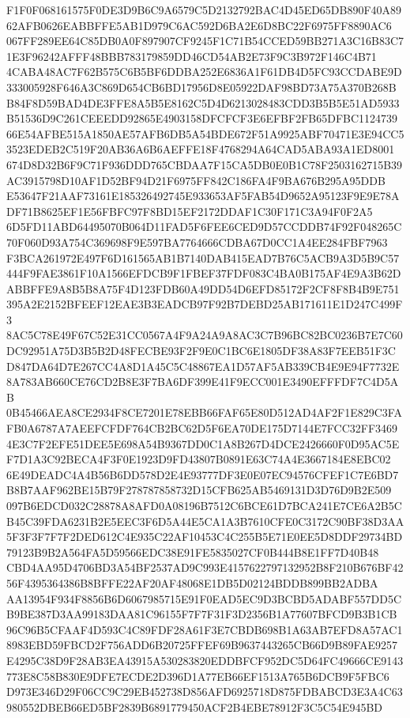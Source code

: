 \documentclass[UTF8,fontset=fandol,zihao=-4,a4paper]{ctexart}
\begin{document}
{{F1F0F068161575F0DE3D9B6C9A6579C5D2132792BAC4D45ED65DB890F40A8962AFB0626EABBFFE5AB1D979C6AC592D6BA2E6D8BC22F6975FF8890AC6
067FF289EE64C85DB0A0F897907CF9245F1C71B54CCED59BB271A3C16B83C71E3F96242AFFF48BBB783179859DD46CD54AB2E73F9C3B972F146C4B71
4CABA48AC7F62B575C6B5BF6DDBA252E6836A1F61DB4D5FC93CCDABE9D333005928F646A3C869D654CB6BD17956D8E05922DAF98BD73A75A370B268B
B84F8D59BAD4DE3FFE8A5B5E8162C5D4D6213028483CDD3B5B5E51AD5933B51536D9C261CEEEDD92865E4903158DFCFCF3E6EFBF2FB65DFBC1124739
66E54AFBE515A1850AE57AFB6DB5A54BDE672F51A9925ABF70471E3E94CC53523EDEB2C519F20AB36A6B6AEFFE18F4768294A64CAD5ABA93A1ED8001
674D8D32B6F9C71F936DDD765CBDAA7F15CA5DB0E0B1C78F2503162715B39AC3915798D10AF1D52BF94D21F6975FF842C186FA4F9BA676B295A95DDB
E53647F21AAF73161E185326492745E933653AF5FAB54D9652A95123F9E9E78ADF71B8625EF1E56FBFC97F8BD15EF2172DDAF1C30F171C3A94F0F2A5
6D5FD11ABD64495070B064D11FAD5F6FEE6CED9D57CCDDB74F92F048265C70F060D93A754C369698F9E597BA7764666CDBA67D0CC1A4EE284FBF7963
F3BCA261972E497F6D161565AB1B7140DAB415EAD7B76C5ACB9A3D5B9C57444F9FAE3861F10A1566EFDCB9F1FBEF37FDF083C4BA0B175AF4E9A3B62D
ABBFFE9A8B5B8A75F4D123FDB60A49DD54D6EFD85172F2CF8F8B4B9E751395A2E2152BFEEF12EAE3B3EADCB97F92B7DEBD25AB171611E1D247C499F3
8AC5C78E49F67C52E31CC0567A4F9A24A9A8AC3C7B96BC82BC0236B7E7C60DC92951A75D3B5B2D48FECBE93F2F9E0C1BC6E1805DF38A83F7EEB51F3C
D847DA64D7E267CC4A8D1A45C5C48867EA1D57AF5AB339CB4E9E94F7732E8A783AB660CE76CD2B8E3F7BA6DF399E41F9ECC001E3490EFFFDF7C4D5AB
0B45466AEA8CE2934F8CE7201E78EBB66FAF65E80D512AD4AF2F1E829C3FAFB0A6787A7AEEFCFDF764CB2BC62D5F6EA70DE175D7144E7FCC32FF3469
4E3C7F2EFE51DEE5E698A54B9367DD0C1A8B267D4DCE2426660F0D95AC5EF7D1A3C92BECA4F3F0E1923D9FD43807B0891E63C74A4E3667184E8EBC02
6E49DEADC4A4B56B6DD578D2E4E93777DF3E0E07EC94576CFEF1C7E6BD7B8B7AAF962BE15B79F278787858732D15CFB625AB5469131D3D76D9B2E509
097B6EDCD032C28878A8AFD0A08196B7512C6BCE61D7BCA241E7CE6A2B5CB45C39FDA6231B2E5EEC3F6D5A44E5CA1A3B7610CFE0C3172C90BF38D3AA
5F3F3F7F7F2DED612C4E935C22AF10453C4C255B5E71E0EE5D8DDF29734BD79123B9B2A564FA5D59566EDC38E91FE5835027CF0B444B8E1FF7D40B48
CBD4AA95D4706BD3A54BF2537AD9C993E4157622797132952B8F210B676BF4256F4395364386B8BFFE22AF20AF48068E1DB5D02124BDDB899BB2ADBA
AA13954F934F8856B6D6067985715E91F0EAD5EC9D3BCBD5ADABF557DD5CB9BE387D3AA99183DAA81C96155F7F7F31F3D2356B1A77607BFCD9B3B1CB
96C96B5CFAAF4D593C4C89FDF28A61F3E7CBDB698B1A63AB7EFD8A57AC18983EBD59FBCD2F756ADD6B20725FFEF69B9637443265CB66D9B89FAE9257
E4295C38D9F28AB3EA43915A530283820EDDBFCF952DC5D64FC49666CE9143773E8C58B830E9DFE7ECDE2D396D1A77EB66EF1513A765B6DCB9F5FBC6
D973E346D29F06CC9C29EB452738D856AFD6925718D875FDBABCD3E3A4C63980552DBEB66ED5BF2839B6891779450ACF2B4EBE78912F3C5C54E945BD
}}
\end{document}
